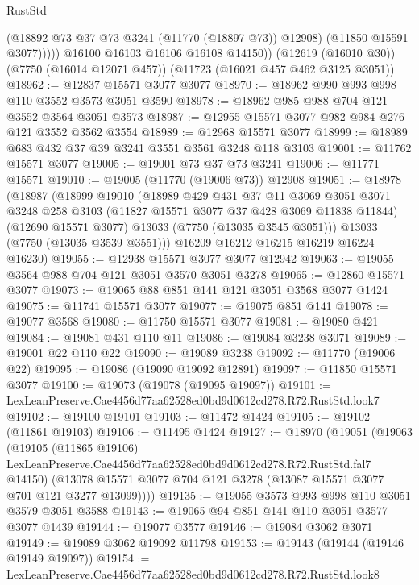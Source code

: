 \begin{lexlean}{RustStd}
\begin{coremodule}
                (@18892 @73 @37 @73 @3241 (@11770 (@18897 @73)) @12908)
                (@11850 @15591 @3077)))))
        @16100
        @16103
        @16106
        @16108
        @14150))
    (@12619 (@16010 @30))
    (@7750 (@16014 @12071 @457))
    (@11723 (@16021 @457 @462 @3125 @3051))
@18962 := @12837 @15571 @3077 @3077
@18970 := @18962 @990 @993 @998 @110 @3552 @3573 @3051 @3590
@18978 := @18962 @985 @988 @704 @121 @3552 @3564 @3051 @3573
@18987 := @12955 @15571 @3077 @982 @984 @276 @121 @3552 @3562 @3554
@18989 := @12968 @15571 @3077
@18999 := @18989 @683 @432 @37 @39 @3241 @3551 @3561 @3248 @118 @3103
@19001 := @11762 @15571 @3077
@19005 := @19001 @73 @37 @73 @3241
@19006 := @11771 @15571
@19010 := @19005 (@11770 (@19006 @73)) @12908
@19051 := @18978
    (@18987
      (@18999
        @19010
        (@18989
          @429
          @431
          @37
          @11
          @3069
          @3051
          @3071
          @3248
          @258
          @3103
          (@11827 @15571 @3077 @37 @428 @3069 @11838 @11844)
          (@12690 @15571 @3077)
          @13033
          (@7750 (@13035 @3545 @3051)))
        @13033
        (@7750 (@13035 @3539 @3551)))
      @16209
      @16212
      @16215
      @16219
      @16224
      @16230)
@19055 := @12938 @15571 @3077 @3077 @12942
@19063 := @19055 @3564 @988 @704 @121 @3051 @3570 @3051 @3278
@19065 := @12860 @15571 @3077
@19073 := @19065 @88 @851 @141 @121 @3051 @3568 @3077 @1424
@19075 := @11741 @15571 @3077
@19077 := @19075 @851 @141
@19078 := @19077 @3568
@19080 := @11750 @15571 @3077
@19081 := @19080 @421
@19084 := @19081 @431 @110 @11
@19086 := @19084 @3238 @3071
@19089 := @19001 @22 @110 @22
@19090 := @19089 @3238
@19092 := @11770 (@19006 @22)
@19095 := @19086 (@19090 @19092 @12891)
@19097 := @11850 @15571 @3077
@19100 := @19073 (@19078 (@19095 @19097))
@19101 := LexLeanPreserve.Cae4456d77aa62528ed0bd9d0612cd278.R72.RustStd.look7
@19102 := @19100 @19101
@19103 := @11472 @1424
@19105 := @19102 (@11861 @19103)
@19106 := @11495 @1424
@19127 := @18970
    (@19051
      (@19063
        (@19105
          (@11865 @19106)
          LexLeanPreserve.Cae4456d77aa62528ed0bd9d0612cd278.R72.RustStd.fal7
          @14150)
        (@13078 @15571 @3077 @704 @121 @3278 (@13087 @15571 @3077 @701 @121 @3277 @13099))))
@19135 := @19055 @3573 @993 @998 @110 @3051 @3579 @3051 @3588
@19143 := @19065 @94 @851 @141 @110 @3051 @3577 @3077 @1439
@19144 := @19077 @3577
@19146 := @19084 @3062 @3071
@19149 := @19089 @3062 @19092 @11798
@19153 := @19143 (@19144 (@19146 @19149 @19097))
@19154 := LexLeanPreserve.Cae4456d77aa62528ed0bd9d0612cd278.R72.RustStd.look8

\end{coremodule}
\end{lexlean}
